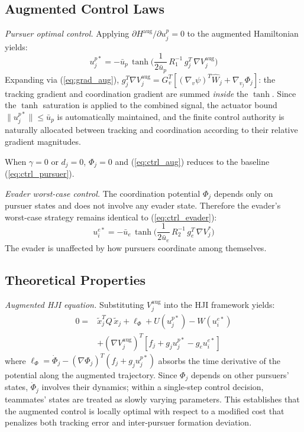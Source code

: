 \documentclass[conference]{IEEEtran}
\begin{document}
\subsection{Augmented Control Laws}

\textit{Pursuer optimal control.} Applying $\partial H^{\mathrm{aug}}/\partial u_j^p = 0$ to the augmented Hamiltonian yields:
\begin{equation}\label{eq:ctrl_aug}
u_j^{p*} = -\bar{u}_p\,\tanh\!\bigg(\frac{1}{2\bar{u}_p}\,R_1^{-1}\,g_j^T\,\nabla V_j^{\mathrm{aug}}\bigg)
\end{equation}
Expanding via (\ref{eq:grad_aug}), $g_j^T \nabla V_j^{\mathrm{aug}} = G_v^T[(\nabla_v \psi)^T \hat{W}_j + \nabla_{v_j}\Phi_j]$: the tracking gradient and coordination gradient are summed \emph{inside} the $\tanh$. Since the $\tanh$ saturation is applied to the combined signal, the actuator bound $\|u_j^{p*}\| \leq \bar{u}_p$ is automatically maintained, and the finite control authority is naturally allocated between tracking and coordination according to their relative gradient magnitudes.

When $\gamma = 0$ or $d_j = 0$, $\Phi_j = 0$ and (\ref{eq:ctrl_aug}) reduces to the baseline (\ref{eq:ctrl_pursuer}).

\textit{Evader worst-case control.} The coordination potential $\Phi_j$ depends only on pursuer states and does not involve any evader state. Therefore the evader's worst-case strategy remains identical to (\ref{eq:ctrl_evader}):
\begin{equation}\label{eq:ctrl_evader_aug}
u_i^{e*} = -\bar{u}_e\,\tanh\!\bigg(\frac{1}{2\bar{u}_e}\,R_2^{-1}\,g_e^T\,\nabla V_j^*\bigg)
\end{equation}
The evader is unaffected by how pursuers coordinate among themselves.

\subsection{Theoretical Properties}

\textit{Augmented HJI equation.} Substituting $V_j^{\mathrm{aug}}$ into the HJI framework yields:
\begin{equation}\label{eq:aug_hji}
\begin{split}
0 ={} & \tilde{x}_j^T Q\,\tilde{x}_j + \ell_\Phi + U(u_j^{p*}) - W(u_i^{e*}) \\
& + (\nabla V_j^{\mathrm{aug}})^T [f_j + g_j u_j^{p*} - g_e u_i^{e*}]
\end{split}
\end{equation}
where $\ell_\Phi = \dot{\Phi}_j - (\nabla \Phi_j)^T(f_j + g_j u_j^{p*})$ absorbs the time derivative of the potential along the augmented trajectory. Since $\Phi_j$ depends on other pursuers' states, $\dot{\Phi}_j$ involves their dynamics; within a single-step control decision, teammates' states are treated as slowly varying parameters. This establishes that the augmented control is locally optimal with respect to a modified cost that penalizes both tracking error and inter-pursuer formation deviation.
\end{document}
